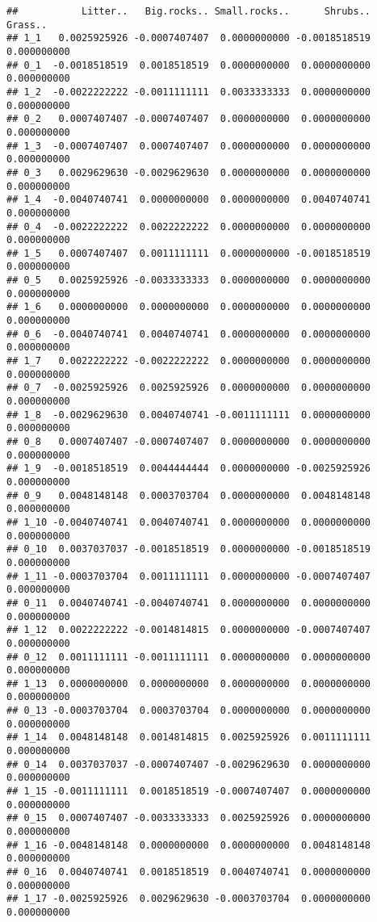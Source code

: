 \documentclass[]{article}
\begin{document}
\begin{verbatim}
##           Litter..   Big.rocks.. Small.rocks..      Shrubs..      Grass..
## 1_1   0.0025925926 -0.0007407407  0.0000000000 -0.0018518519  0.000000000
## 0_1  -0.0018518519  0.0018518519  0.0000000000  0.0000000000  0.000000000
## 1_2  -0.0022222222 -0.0011111111  0.0033333333  0.0000000000  0.000000000
## 0_2   0.0007407407 -0.0007407407  0.0000000000  0.0000000000  0.000000000
## 1_3  -0.0007407407  0.0007407407  0.0000000000  0.0000000000  0.000000000
## 0_3   0.0029629630 -0.0029629630  0.0000000000  0.0000000000  0.000000000
## 1_4  -0.0040740741  0.0000000000  0.0000000000  0.0040740741  0.000000000
## 0_4  -0.0022222222  0.0022222222  0.0000000000  0.0000000000  0.000000000
## 1_5   0.0007407407  0.0011111111  0.0000000000 -0.0018518519  0.000000000
## 0_5   0.0025925926 -0.0033333333  0.0000000000  0.0000000000  0.000000000
## 1_6   0.0000000000  0.0000000000  0.0000000000  0.0000000000  0.000000000
## 0_6  -0.0040740741  0.0040740741  0.0000000000  0.0000000000  0.000000000
## 1_7   0.0022222222 -0.0022222222  0.0000000000  0.0000000000  0.000000000
## 0_7  -0.0025925926  0.0025925926  0.0000000000  0.0000000000  0.000000000
## 1_8  -0.0029629630  0.0040740741 -0.0011111111  0.0000000000  0.000000000
## 0_8   0.0007407407 -0.0007407407  0.0000000000  0.0000000000  0.000000000
## 1_9  -0.0018518519  0.0044444444  0.0000000000 -0.0025925926  0.000000000
## 0_9   0.0048148148  0.0003703704  0.0000000000  0.0048148148  0.000000000
## 1_10 -0.0040740741  0.0040740741  0.0000000000  0.0000000000  0.000000000
## 0_10  0.0037037037 -0.0018518519  0.0000000000 -0.0018518519  0.000000000
## 1_11 -0.0003703704  0.0011111111  0.0000000000 -0.0007407407  0.000000000
## 0_11  0.0040740741 -0.0040740741  0.0000000000  0.0000000000  0.000000000
## 1_12  0.0022222222 -0.0014814815  0.0000000000 -0.0007407407  0.000000000
## 0_12  0.0011111111 -0.0011111111  0.0000000000  0.0000000000  0.000000000
## 1_13  0.0000000000  0.0000000000  0.0000000000  0.0000000000  0.000000000
## 0_13 -0.0003703704  0.0003703704  0.0000000000  0.0000000000  0.000000000
## 1_14  0.0048148148  0.0014814815  0.0025925926  0.0011111111  0.000000000
## 0_14  0.0037037037 -0.0007407407 -0.0029629630  0.0000000000  0.000000000
## 1_15 -0.0011111111  0.0018518519 -0.0007407407  0.0000000000  0.000000000
## 0_15  0.0007407407 -0.0033333333  0.0025925926  0.0000000000  0.000000000
## 1_16 -0.0048148148  0.0000000000  0.0000000000  0.0048148148  0.000000000
## 0_16  0.0040740741  0.0018518519  0.0040740741  0.0000000000  0.000000000
## 1_17 -0.0025925926  0.0029629630 -0.0003703704  0.0000000000  0.000000000

\end{verbatim}
\end{document}
